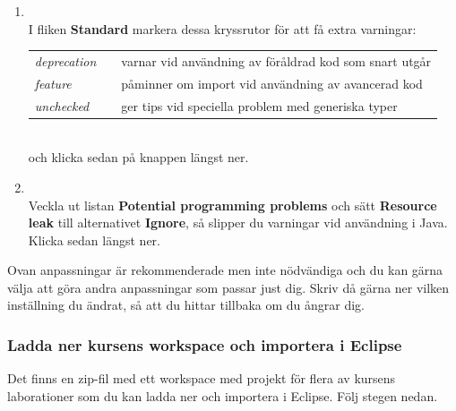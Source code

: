 \begin{enumerate}
\item  \EclipsePrefs{}
\\ I fliken \textbf{Standard} markera dessa kryssrutor för att få extra varningar: \\
\begin{tabular}{l @{}l @{}l}
\textit{deprecation} & \FramedCheckmark{} & varnar vid användning av föråldrad kod som snart utgår \\
\textit{feature}     & \FramedCheckmark{} & påminner om import vid användning av avancerad kod  \\
\textit{unchecked}   & \FramedCheckmark{} & ger tips vid speciella problem med generiska typer \\
\end{tabular}\\
och klicka sedan på knappen  längst ner.

\item \EclipsePrefs{}
\\ Veckla ut listan \textbf{Potential programming problems} och sätt \textbf{Resource leak} till alternativet \textbf{Ignore}, så slipper du varningar vid användning  i Java. Klicka sedan  längst ner.

\end{enumerate}

\noindent Ovan anpassningar är rekommenderade men inte nödvändiga och du kan gärna välja att göra andra anpassningar som passar just dig. Skriv då gärna ner vilken inställning du ändrat, så att du hittar tillbaka om du ångrar dig.







\subsubsection{Ladda ner kursens workspace och importera i Eclipse}\label{subsubsection:download--import-workspace}

Det finns en zip-fil med ett workspace med projekt för flera av kursens laborationer som du kan ladda ner och importera i Eclipse. Följ stegen nedan.

